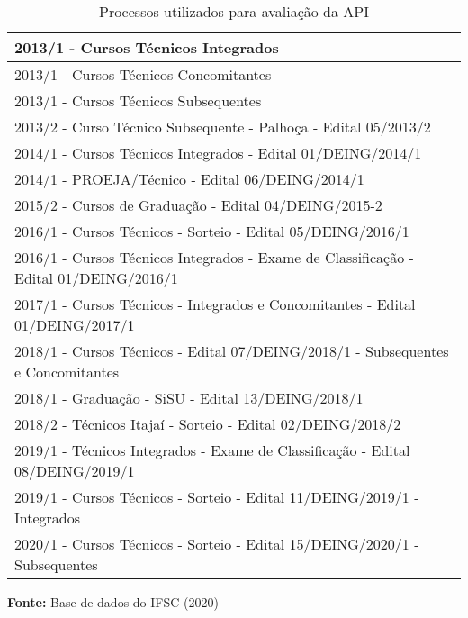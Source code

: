 \begin{table}
\caption{Processos utilizados para avaliação da API}
\label{processos_utilizados}
\centering
\begin{tabular}{ |l| }
 \hline
2013/1 - Cursos Técnicos Integrados                                                        \\ \hline
2013/1 - Cursos Técnicos Concomitantes                                                     \\ \hline
2013/1 - Cursos Técnicos Subsequentes                                                      \\ \hline
2013/2 - Curso Técnico Subsequente - Palhoça - Edital 05/2013/2                            \\ \hline
2014/1 - Cursos Técnicos Integrados - Edital 01/DEING/2014/1                               \\ \hline
2014/1 - PROEJA/Técnico - Edital 06/DEING/2014/1                                           \\ \hline
2015/2 - Cursos de Graduação - Edital 04/DEING/2015-2                                      \\ \hline
2016/1 - Cursos Técnicos - Sorteio - Edital 05/DEING/2016/1                                \\ \hline
2016/1 - Cursos Técnicos Integrados - Exame de Classificação - Edital 01/DEING/2016/1      \\ \hline
2017/1 - Cursos Técnicos - Integrados e Concomitantes - Edital 01/DEING/2017/1             \\ \hline
2018/1 - Cursos Técnicos - Edital 07/DEING/2018/1 - Subsequentes e Concomitantes \\ \hline
2018/1 - Graduação - SiSU - Edital 13/DEING/2018/1                                         \\ \hline
2018/2 - Técnicos Itajaí - Sorteio - Edital 02/DEING/2018/2                                \\ \hline
2019/1 - Técnicos Integrados - Exame de Classificação - Edital 08/DEING/2019/1             \\ \hline
2019/1 - Cursos Técnicos - Sorteio - Edital 11/DEING/2019/1 - Integrados                   \\ \hline
2020/1 - Cursos Técnicos - Sorteio - Edital 15/DEING/2020/1 - Subsequentes                 \\ \hline
 \end{tabular} 
  \par\medskip\textbf{Fonte:} Base de dados do IFSC (2020) \par\medskip
\end{table}
